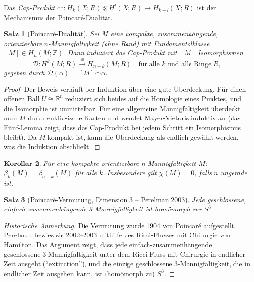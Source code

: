 \documentclass[12pt,a4paper]{amsart}
\newtheorem{theorem}{Satz}[section]
\newtheorem{corollary}[theorem]{Korollar}
\theoremstyle{definition}
\begin{document}
Das \emph{Cap-Produkt} $\frown\colon H_k(X;R) \otimes H^l(X;R) \to H_{k-l}(X;R)$
ist der Mechanismus der Poincar\'e-Dualit\"at.

\begin{theorem}[Poincar\'e-Dualit\"at]
\label{thm:poincare_dualitaet}
Sei $M$ eine kompakte, zusammenh\"angende, orientierbare $n$-Mannigfaltigkeit
(ohne Rand) mit Fundamentalklasse $[M] \in H_n(M;\mathbb{Z})$. Dann induziert
das Cap-Produkt mit $[M]$ Isomorphismen
\[
  \mathcal{D}\colon H^k(M;R) \xrightarrow{\cong} H_{n-k}(M;R)
  \quad \text{f\"ur alle } k \text{ und alle Ringe } R,
\]
gegeben durch $\mathcal{D}(\alpha) = [M] \frown \alpha$.
\end{theorem}
\begin{proof}
Der Beweis verl\"auft per Induktion \"uber eine gute \"Uberdeckung. F\"ur einen
offenen Ball $U \cong \mathbb{R}^n$ reduziert sich beides auf die Homologie eines
Punktes, und die Isomorphie ist unmittelbar. F\"ur eine allgemeine Mannigfaltigkeit
\"uberdeckt man $M$ durch euklid-ische Karten und wendet Mayer-Vietoris induktiv
an (das F\"unf-Lemma zeigt, dass das Cap-Produkt bei jedem Schritt ein Isomorphismus
bleibt). Da $M$ kompakt ist, kann die \"Uberdeckung als endlich gew\"ahlt werden,
was die Induktion abschlie\ss{}t.
\end{proof}

\begin{corollary}
F\"ur eine kompakte orientierbare $n$-Mannigfaltigkeit $M$:
$\beta_k(M) = \beta_{n-k}(M)$ f\"ur alle $k$.
Insbesondere gilt $\chi(M) = 0$, falls $n$ ungerade ist.
\end{corollary}

\begin{theorem}[Poincar\'e-Vermutung, Dimension 3 -- Perelman 2003]
\label{thm:poincare_vermutung}
Jede geschlossene, einfach zusammenh\"angende 3-Mannigfaltigkeit ist
hom\"omorph zur $S^3$.
\end{theorem}
\begin{proof}[Historische Anmerkung]
Die Vermutung wurde 1904 von Poincar\'e aufgestellt. Perelman bewies sie
2002--2003 mithilfe des Ricci-Flusses mit Chirurgie von Hamilton. Das Argument
zeigt, dass jede einfach-zusammenh\"angende geschlossene 3-Mannigfaltigkeit
unter dem Ricci-Fluss mit Chirurgie in endlicher Zeit ausgeht (``extinction''),
und die einzige geschlossene 3-Mannigfaltigkeit, die in endlicher Zeit ausgehen
kann, ist (hom\"omorph zu) $S^3$.
\end{proof}

\end{document}
